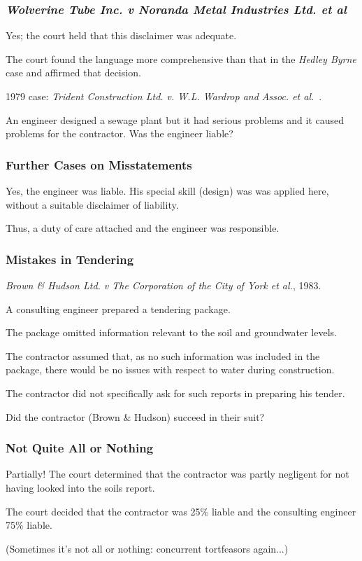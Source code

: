 \begin{frame}
\frametitle{\textit{Wolverine Tube Inc. v Noranda Metal Industries Ltd. et al}}

Yes; the court held that this disclaimer was adequate.

The court found the language more comprehensive than that in the \textit{Hedley Byrne} case and affirmed that decision.

1979 case: \textit{Trident Construction Ltd. v. W.L. Wardrop and Assoc. et al.}~\cite{lpe}.

An engineer designed a sewage plant but it had serious problems and it caused problems for the contractor. Was the engineer liable?

\end{frame}



\begin{frame}
\frametitle{Further Cases on Misstatements}

Yes, the engineer was liable. His special skill (design) was was applied here, without a suitable disclaimer of liability.

Thus, a duty of care attached and the engineer was responsible.

\end{frame}



\begin{frame}
\frametitle{Mistakes in Tendering}

\textit{Brown \& Hudson Ltd. v The Corporation of the City of York et al.}, 1983.

A consulting engineer prepared a tendering package.

The package omitted information relevant to the soil and groundwater levels.

The contractor assumed that, as no such information was included in the package, there would be no issues with respect to water during construction.

The contractor did not specifically ask for such reports in preparing his tender.

Did the contractor (Brown \& Hudson) succeed in their suit?

\end{frame}



\begin{frame}
\frametitle{Not Quite All or Nothing}

Partially! The court determined that the contractor was partly negligent for not having looked into the soils report.

The court decided that the contractor was 25\% liable and the consulting engineer 75\% liable.

(Sometimes it's not all or nothing: concurrent tortfeasors again...)

\end{frame}



